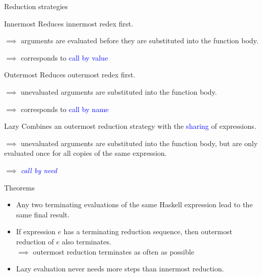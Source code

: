 \documentclass{beamer}
\begin{document}
\begin{frame}{Reduction strategies}

\begin{block}{Innermost}
Reduces innermost redex first. \par\pause
$\implies$ arguments are evaluated before they are substituted into the function body. \par\pause
$\implies$ corresponds to \textcolor{blue}{call by value}
\end{block}

\pause

\begin{block}{Outermost}
Reduces outermost redex first. \par\pause
$\implies$ unevaluated arguments are substituted into the function body. \par\pause
$\implies$ corresponds to \textcolor{blue}{call by name}
\end{block}

\pause

\begin{block}{Lazy}
Combines an outermost reduction strategy with the \textcolor{blue}{sharing} of expressions. \par\pause
$\implies$ unevaluated arguments are substituted into the function body, but are only evaluated once for all copies of the same expression. \par\pause
$\implies$ \textit{\textcolor{blue}{call by need}}
\end{block}

\end{frame}

\begin{frame}{Theorems}

\begin{itemize}
    \item Any two terminating evaluations of the same Haskell expression lead to the same final result.\pause
    \item If expression $e$ has a terminating reduction sequence, then outermost reduction of $e$ also terminates. \\ \pause
        $\implies$ outermost reduction terminates as often as possible\pause
    \item Lazy evaluation never needs more steps than innermost reduction.
\end{itemize}

\end{frame}
\end{document}
